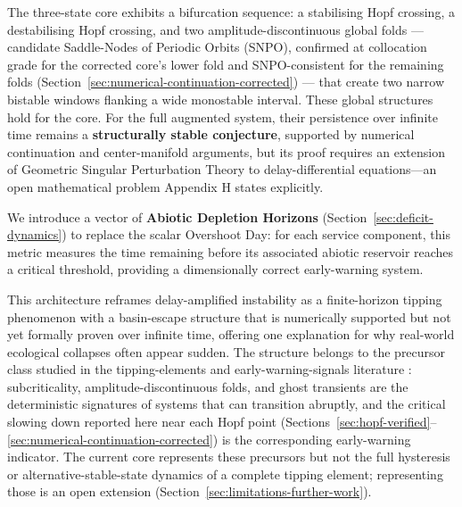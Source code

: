 \documentclass[twocolumn,10pt]{article}
\begin{document}
The three-state core exhibits a bifurcation sequence: a stabilising Hopf crossing, a destabilising Hopf crossing, and two amplitude-discontinuous global folds --- candidate Saddle-Nodes of Periodic Orbits (SNPO), confirmed at collocation grade for the corrected core's lower fold and SNPO-consistent for the remaining folds (Section~\ref{sec:numerical-continuation-corrected}) --- that create two narrow bistable windows flanking a wide monostable interval. These global structures hold for the core. For the full augmented system, their persistence over infinite time remains a \textbf{structurally stable conjecture}, supported by numerical continuation and center-manifold arguments, but its proof requires an extension of Geometric Singular Perturbation Theory to delay-differential equations---an open mathematical problem Appendix H states explicitly.

We introduce a vector of \textbf{Abiotic Depletion Horizons} (Section~\ref{sec:deficit-dynamics}) to replace the scalar Overshoot Day: for each service component, this metric measures the time remaining before its associated abiotic reservoir reaches a critical threshold, providing a dimensionally correct early-warning system.

This architecture reframes delay-amplified instability as a finite-horizon tipping phenomenon with a basin-escape structure that is numerically supported but not yet formally proven over infinite time, offering one explanation for why real-world ecological collapses often appear sudden. The structure belongs to the precursor class studied in the tipping-elements and early-warning-signals literature \cite{lenton2008,scheffer2009}: subcriticality, amplitude-discontinuous folds, and ghost transients are the deterministic signatures of systems that can transition abruptly, and the critical slowing down reported here near each Hopf point (Sections~\ref{sec:hopf-verified}--\ref{sec:numerical-continuation-corrected}) is the corresponding early-warning indicator. The current core represents these precursors but not the full hysteresis or alternative-stable-state dynamics of a complete tipping element; representing those is an open extension (Section~\ref{sec:limitations-further-work}).
\end{document}
